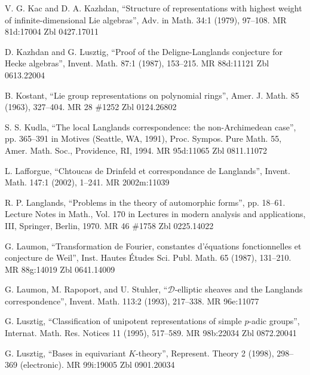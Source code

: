 \par{} V. G. Kac and D. A. Kazhdan, ``Structure of representations with highest weight of infinite-dimensional Lie algebras'', Adv. in Math. 34:1 (1979), 97--108. MR 81d:17004 Zbl 0427.17011

\par{} D. Kazhdan and G. Lusztig, ``Proof of the Deligne-Langlands conjecture for Hecke algebras'', Invent. Math. 87:1 (1987), 153--215. MR 88d:11121 Zbl 0613.22004

\par\noindent [Kostant 1963] B. Kostant, ``Lie group representations on polynomial rings'', Amer. J. Math. 85 (1963), 327--404. MR 28 \#1252 Zbl 0124.26802

\par\noindent [Kudla 1994] S. S. Kudla, ``The local Langlands correspondence: the non-Archimedean case'', pp. 365--391 in Motives (Seattle, WA, 1991), Proc. Sympos. Pure Math. 55, Amer. Math. Soc., Providence, RI, 1994. MR 95d:11065 Zbl 0811.11072

\par\noindent [Lafforgue 2002] L. Lafforgue, ``Chtoucas de Drinfeld et correspondance de Langlands'', Invent. Math. 147:1 (2002), 1--241. MR 2002m:11039

\par\noindent [Langlands 1970] R. P. Langlands, ``Problems in the theory of automorphic forms'', pp. 18--61. Lecture Notes in Math., Vol. 170 in Lectures in modern analysis and applications, III, Springer, Berlin, 1970. MR 46 \#1758 Zbl 0225.14022

\par\noindent [Laumon 1987] G. Laumon, ``Transformation de Fourier, constantes d'\'equations fonctionnelles et conjecture de Weil'', Inst. Hautes \'Etudes Sci. Publ. Math. 65 (1987), 131--210. MR 88g:14019 Zbl 0641.14009

\par\noindent [Laumon et al. 1993] G. Laumon, M. Rapoport, and U. Stuhler, ``$\mathcal{D}$-elliptic sheaves and the Langlands correspondence'', Invent. Math. 113:2 (1993), 217--338. MR 96e:11077

\par\noindent [Lusztig 1995] G. Lusztig, ``Classification of unipotent representations of simple $p$-adic groups'', Internat. Math. Res. Notices 11 (1995), 517--589. MR 98b:22034 Zbl 0872.20041

\par\noindent [Lusztig 1998] G. Lusztig, ``Bases in equivariant $K$-theory'', Represent. Theory 2 (1998), 298--369 (electronic). MR 99i:19005 Zbl 0901.20034

